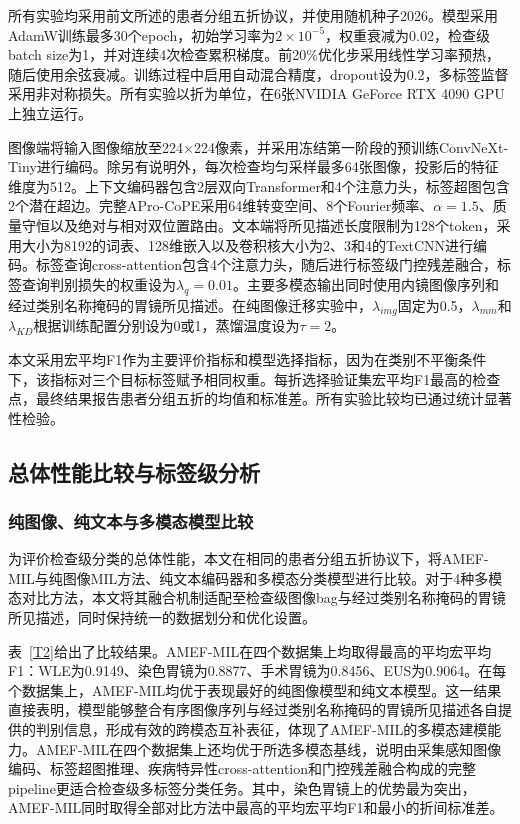 \documentclass[Afour,sagev,times]{sagej}
\begin{document}
所有实验均采用前文所述的患者分组五折协议，并使用随机种子2026。模型采用AdamW训练最多30个epoch，初始学习率为$2\times10^{-5}$，权重衰减为0.02，检查级batch size为1，并对连续4次检查累积梯度。前20\%优化步采用线性学习率预热，随后使用余弦衰减。训练过程中启用自动混合精度，dropout设为0.2，多标签监督采用非对称损失。所有实验以折为单位，在6张NVIDIA GeForce RTX 4090 GPU上独立运行。

图像端将输入图像缩放至224$\times$224像素，并采用冻结第一阶段的预训练ConvNeXt-Tiny进行编码。除另有说明外，每次检查均匀采样最多64张图像，投影后的特征维度为512。上下文编码器包含2层双向Transformer和4个注意力头，标签超图包含2个潜在超边。完整APro-CoPE采用64维转变空间、8个Fourier频率、$\alpha=1.5$、质量守恒以及绝对与相对双位置路由。文本端将所见描述长度限制为128个token，采用大小为8192的词表、128维嵌入以及卷积核大小为2、3和4的TextCNN进行编码。标签查询cross-attention包含4个注意力头，随后进行标签级门控残差融合，标签查询判别损失的权重设为$\lambda_q=0.01$。主要多模态输出同时使用内镜图像序列和经过类别名称掩码的胃镜所见描述。在纯图像迁移实验中，$\lambda_{img}$固定为0.5，$\lambda_{mm}$和$\lambda_{KD}$根据训练配置分别设为0或1，蒸馏温度设为$\tau=2$。

本文采用宏平均F1作为主要评价指标和模型选择指标，因为在类别不平衡条件下，该指标对三个目标标签赋予相同权重。每折选择验证集宏平均F1最高的检查点，最终结果报告患者分组五折的均值和标准差。所有实验比较均已通过统计显著性检验。

\subsection{总体性能比较与标签级分析}

\subsubsection{纯图像、纯文本与多模态模型比较}

为评价检查级分类的总体性能，本文在相同的患者分组五折协议下，将AMEF-MIL与纯图像MIL方法、纯文本编码器和多模态分类模型进行比较。对于4种多模态对比方法，本文将其融合机制适配至检查级图像bag与经过类别名称掩码的胃镜所见描述，同时保持统一的数据划分和优化设置。\cite{R29,R30,R31,R32}

表~\ref{T2}给出了比较结果。AMEF-MIL在四个数据集上均取得最高的平均宏平均F1：WLE为0.9149、染色胃镜为0.8877、手术胃镜为0.8456、EUS为0.9064。在每个数据集上，AMEF-MIL均优于表现最好的纯图像模型和纯文本模型。这一结果直接表明，模型能够整合有序图像序列与经过类别名称掩码的胃镜所见描述各自提供的判别信息，形成有效的跨模态互补表征，体现了AMEF-MIL的多模态建模能力。AMEF-MIL在四个数据集上还均优于所选多模态基线，说明由采集感知图像编码、标签超图推理、疾病特异性cross-attention和门控残差融合构成的完整pipeline更适合检查级多标签分类任务。其中，染色胃镜上的优势最为突出，AMEF-MIL同时取得全部对比方法中最高的平均宏平均F1和最小的折间标准差。
\end{document}
